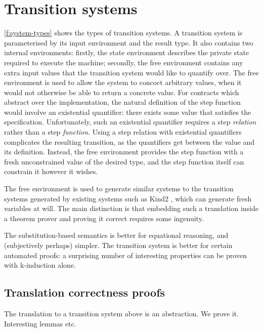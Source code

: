 
\section{Transition systems}
\label{s:transition}


\autoref{f:system-types} shows the types of transition systems.
A transition system is parameterised by its input environment and the result type.
It also contains two internal environments: firstly, the state environment describes the private state required to execute the machine; secondly, the free environment contains any extra input values that the transition system would like to quantify over.
The free environment is used to allow the system to concoct arbitrary values, when it would not otherwise be able to return a concrete value.
For contracts which abstract over the implementation, the natural definition of the step function would involve an existential quantifier: there exists some value that satisfies the specification.
Unfortunately, such an existential quantifier requires a step \emph{relation} rather than a step \emph{function}.
Using a step relation with existential quantifiers complicates the resulting transition, as the quantifiers get between the value and its definition.
Instead, the free environment provides the step function with a fresh unconstrained value of the desired type, and the step function itself can constrain it however it wishes.

The free environment is used to generate similar systems to the transition systems generated by existing systems such as Kind2 \cite{champion2016kind2}, which can generate fresh variables at will.
The main distinction is that embedding such a translation inside a theorem prover and proving it correct requires some ingenuity.



The substitution-based semantics is better for equational reasoning, and (subjectively perhaps) simpler.
The transition system is better for certain automated proofs: a surprising number of interesting properties can be proven with k-induction alone.

\subsection{Translation correctness proofs}

The translation to a transition system above is an abstraction.
We prove it.
Interesting lemmas etc.

